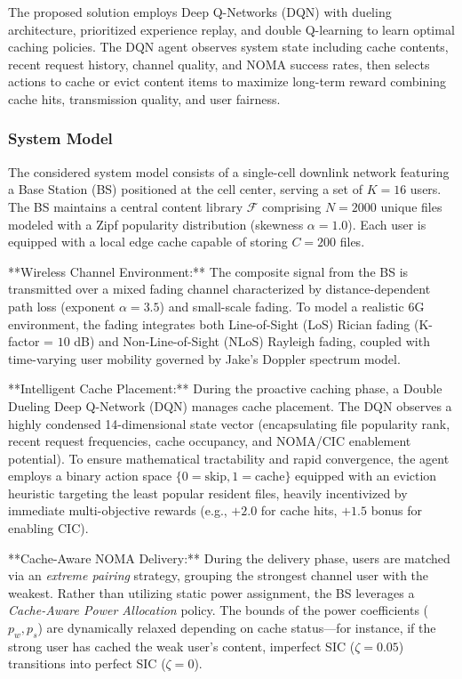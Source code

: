 \documentclass[12pt,a4paper]{article}
\begin{document}
The proposed solution employs Deep Q-Networks (DQN) with dueling architecture, prioritized experience replay, and double Q-learning to learn optimal caching policies. The DQN agent observes system state including cache contents, recent request history, channel quality, and NOMA success rates, then selects actions to cache or evict content items to maximize long-term reward combining cache hits, transmission quality, and user fairness.

\subsubsection{System Model}
The considered system model consists of a single-cell downlink network featuring a Base Station (BS) positioned at the cell center, serving a set of $K=16$ users. The BS maintains a central content library $\mathcal{F}$ comprising $N=2000$ unique files modeled with a Zipf popularity distribution (skewness $\alpha=1.0$). Each user is equipped with a local edge cache capable of storing $C=200$ files.

**Wireless Channel Environment:** The composite signal from the BS is transmitted over a mixed fading channel characterized by distance-dependent path loss (exponent $\alpha=3.5$) and small-scale fading. To model a realistic 6G environment, the fading integrates both Line-of-Sight (LoS) Rician fading (K-factor = $10$ dB) and Non-Line-of-Sight (NLoS) Rayleigh fading, coupled with time-varying user mobility governed by Jake's Doppler spectrum model.

**Intelligent Cache Placement:** During the proactive caching phase, a Double Dueling Deep Q-Network (DQN) manages cache placement. The DQN observes a highly condensed 14-dimensional state vector (encapsulating file popularity rank, recent request frequencies, cache occupancy, and NOMA/CIC enablement potential). To ensure mathematical tractability and rapid convergence, the agent employs a binary action space $\{0=\text{skip}, 1=\text{cache}\}$ equipped with an eviction heuristic targeting the least popular resident files, heavily incentivized by immediate multi-objective rewards (e.g., $+2.0$ for cache hits, $+1.5$ bonus for enabling CIC).

**Cache-Aware NOMA Delivery:** During the delivery phase, users are matched via an \textit{extreme pairing} strategy, grouping the strongest channel user with the weakest. Rather than utilizing static power assignment, the BS leverages a \textit{Cache-Aware Power Allocation} policy. The bounds of the power coefficients ($p_w, p_s$) are dynamically relaxed depending on cache status—for instance, if the strong user has cached the weak user's content, imperfect SIC ($\zeta=0.05$) transitions into perfect SIC ($\zeta=0$).
\end{document}
